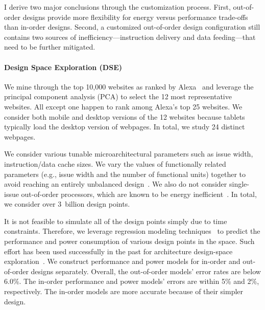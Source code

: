 I derive two major conclusions through the customization process. First, out-of-order designs provide more flexibility for energy versus performance trade-offs than in-order designs. Second, a customized out-of-order design configuration still contains two sources of inefficiency---instruction delivery and data feeding---that need to be further mitigated.

\paragraph{Design Space Exploration (DSE)} We mine through the top 10,000 websites as ranked by Alexa~\cite{alexa} and leverage the principal component analysis (PCA) to select the 12 most representative websites. All except one happen to rank among Alexa's top 25 websites. We consider both mobile and desktop versions of the 12 websites because tablets typically load the desktop version of webpages. In total, we study 24 distinct webpages.

We consider various tunable microarchitectural parameters such as issue width, instruction/data cache sizes. We vary the values of functionally related parameters (e.g., issue width and the number of functional units) together to avoid reaching an entirely unbalanced design~\cite{ilp2}. We also do not consider single-issue out-of-order processors, which are known to be energy inefficient~\cite{marginal}. In total, we consider over 3~billion design points.

It is not feasible to simulate all of the design points simply due to time constraints. Therefore, we leverage regression modeling techniques~\cite{RMS} to predict the performance and power consumption of various design points in the space. Such effort has been used successfully in the past for architecture design-space exploration~\cite{dse,comt}. We construct performance and power models for in-order and out-of-order designs separately. Overall, the out-of-order models' error rates are below 6.0\%. The in-order performance and power models' errors are within 5\% and 2\%, respectively. The in-order models are more accurate because of their simpler design.

